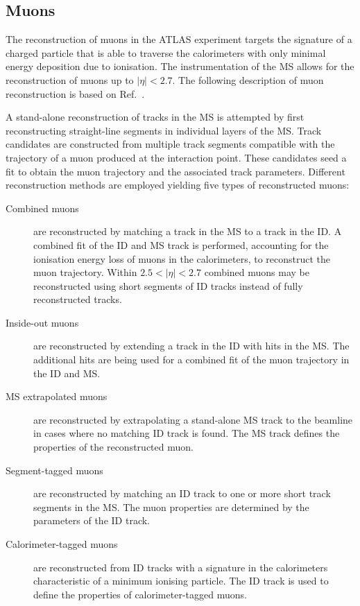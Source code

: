 \subsection{Muons}%
\label{sec:muon_rec}

The reconstruction of muons in the ATLAS experiment targets the signature of a
charged particle that is able to traverse the calorimeters with only minimal
energy deposition due to ionisation. The instrumentation of the MS allows for
the reconstruction of muons up to $|\eta| < 2.7$. The following description of
muon reconstruction is based on Ref.~\cite{MUON-2018-03}.

A stand-alone reconstruction of tracks in the MS is attempted by first
reconstructing straight-line segments in individual layers of the MS. Track
candidates are constructed from multiple track segments compatible with the
trajectory of a muon produced at the interaction point. These candidates seed a
fit to obtain the muon trajectory and the associated track parameters. Different
reconstruction methods are employed yielding five types of reconstructed muons:
\begin{description}

\item[Combined muons] are reconstructed by matching a track in the MS to a track
  in the ID. A combined fit of the ID and MS track is performed, accounting for
  the ionisation energy loss of muons in the calorimeters, to reconstruct the
  muon trajectory. Within $2.5 < |\eta| < 2.7$ combined muons may be
  reconstructed using short segments of ID tracks instead of fully reconstructed
  tracks.

\item[Inside-out muons] are reconstructed by extending a track in the ID with
  hits in the MS. The additional hits are being used for a combined fit of the
  muon trajectory in the ID and MS.

\item[MS extrapolated muons] are reconstructed by extrapolating a stand-alone MS
  track to the beamline in cases where no matching ID track is found. The MS
  track defines the properties of the reconstructed muon. %

\item[Segment-tagged muons] are reconstructed by matching an ID track to one or
  more short track segments in the MS. The muon properties are determined by the
  parameters of the ID track.

\item[Calorimeter-tagged muons] are reconstructed from ID tracks with a
  signature in the calorimeters characteristic of a minimum ionising
  particle. The ID track is used to define the properties of calorimeter-tagged
  muons.

\end{description}

